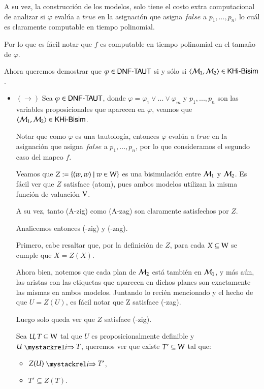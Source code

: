 \begin{demostracion}
    A su vez, la construcción de los modelos, solo tiene el costo extra computacional de analizar si $\varphi$ evalúa a $true$ 
    en la asignación que asigna $false$ a $p_1,...,p_n$, lo cuál es claramente computable en tiempo polinomial.

    Por lo que es fácil notar que $f$ es computable en tiempo polinomial en el tamaño de $\varphi$.

    Ahora queremos demostrar que $\varphi \in \rm\textsf{DNF-TAUT}$ si y sólo si $\langle \mathcal{M}_1,\mathcal{M}_2 \rangle \in \rm\textsf{KHi-Bisim}$.
    \begin{itemize}

    \item $(\rightarrow)$ Sea $\varphi \in \rm\textsf{DNF-TAUT}$, donde $\varphi = \varphi_1 \vee ... \vee \varphi_m$ y $p_1,...,p_n$ 
    son las variables proposicionales que aparecen en $\varphi$, veamos que $\langle \mathcal{M}_1,\mathcal{M}_2 \rangle \in \rm\textsf{KHi-Bisim}$.

    Notar que como $\varphi$ es una tautología, entonces $\varphi$ evalúa a $true$ en la asignación que asigna $false$ a 
    $p_1,...,p_n$, por lo que consideramos el segundo caso del mapeo $f$. 

    Veamos que $Z := \{(w,w) \mid w \in \mathrm{W} \}$ es una bisimulación entre $\mathcal{M}_1$ y $\mathcal{M}_2$. Es fácil ver que 
    $Z$ satisface (atom), pues ambos modelos utilizan la misma función de valuación $\mathrm{V}$.

    A su vez, tanto (A-zig) como (A-zag) son claramente satisfechos por $Z$.

    Analicemos entonces (\KHilogic-zig) y (\KHilogic-zag).

    Primero, cabe resaltar que, por la definición de $Z$, para cada $X \subseteq \mathrm{W}$ se cumple que $X = Z(X)$.

    Ahora bien, notemos que cada plan de $\mathcal{M}_2$ está también en $\mathcal{M}_1$, y más aún, las aristas con las etiquetas 
    que aparecen en dichos planes son exactamente las mismas en ambos modelos. Juntando lo recién mencionado y el hecho de que 
    $U = Z(U)$, es fácil notar que Z satisface (\KHilogic-zag).

    Luego solo queda ver que $Z$ satisface (\KHilogic-zig).

    Sea $U, T \subseteq \mathrm{W}$ tal que $U$ es proposicionalmente definible y $U \ultsExecAgi T$, queremos ver que existe 
    $T' \subseteq \mathrm{W}$ tal que:

    \begin{multicols}{2}
        \begin{itemize}
            \item $Z(U) \ultsExecAgi T'$, 
            \item $T' \subseteq Z(T)$.
        \end{itemize}
    \end{multicols}


\end{itemize}
\end{demostracion}
